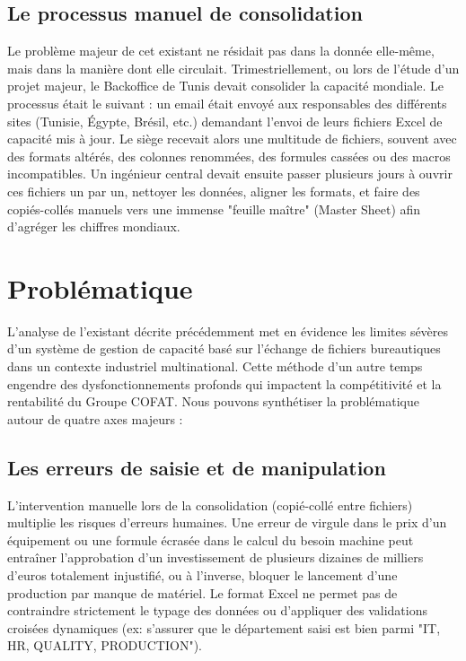 \subsection{Le processus manuel de consolidation}
Le problème majeur de cet existant ne résidait pas dans la donnée elle-même, mais dans la manière dont elle circulait. Trimestriellement, ou lors de l'étude d'un projet majeur, le Backoffice de Tunis devait consolider la capacité mondiale. 
Le processus était le suivant : un email était envoyé aux responsables des différents sites (Tunisie, Égypte, Brésil, etc.) demandant l'envoi de leurs fichiers Excel de capacité mis à jour. Le siège recevait alors une multitude de fichiers, souvent avec des formats altérés, des colonnes renommées, des formules cassées ou des macros incompatibles. 
Un ingénieur central devait ensuite passer plusieurs jours à ouvrir ces fichiers un par un, nettoyer les données, aligner les formats, et faire des copiés-collés manuels vers une immense "feuille maître" (Master Sheet) afin d'agréger les chiffres mondiaux.

\section{Problématique}
L'analyse de l'existant décrite précédemment met en évidence les limites sévères d'un système de gestion de capacité basé sur l'échange de fichiers bureautiques dans un contexte industriel multinational. Cette méthode d'un autre temps engendre des dysfonctionnements profonds qui impactent la compétitivité et la rentabilité du Groupe COFAT. Nous pouvons synthétiser la problématique autour de quatre axes majeurs :

\subsection{Les erreurs de saisie et de manipulation}
L'intervention manuelle lors de la consolidation (copié-collé entre fichiers) multiplie les risques d'erreurs humaines. Une erreur de virgule dans le prix d'un équipement ou une formule écrasée dans le calcul du besoin machine peut entraîner l'approbation d'un investissement de plusieurs dizaines de milliers d'euros totalement injustifié, ou à l'inverse, bloquer le lancement d'une production par manque de matériel. Le format Excel ne permet pas de contraindre strictement le typage des données ou d'appliquer des validations croisées dynamiques (ex: s'assurer que le département saisi est bien parmi "IT, HR, QUALITY, PRODUCTION").

